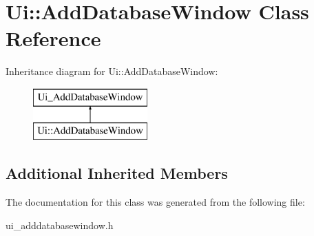 \hypertarget{class_ui_1_1_add_database_window}{}\section{Ui\+:\+:Add\+Database\+Window Class Reference}
\label{class_ui_1_1_add_database_window}
Inheritance diagram for Ui\+:\+:Add\+Database\+Window\+:\begin{figure}[H]
\begin{center}
\leavevmode
\includegraphics[height=2.000000cm]{class_ui_1_1_add_database_window}
\end{center}
\end{figure}
\subsection*{Additional Inherited Members}


The documentation for this class was generated from the following file\+:\begin{DoxyCompactItemize}
\item 
ui\+\_\+adddatabasewindow.\+h\end{DoxyCompactItemize}
